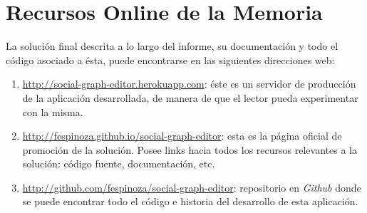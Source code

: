 \section{Recursos Online de la Memoria} %
\label{sec:recursos_online_memoria}

La solución final descrita a lo largo del informe, su documentación y todo el código asociado a ésta, puede encontrarse en las siguientes direcciones web:

  \begin{enumerate}
    \item \url{http://social-graph-editor.herokuapp.com}: éste es un servidor de producción de la aplicación desarrollada, de manera de que el lector pueda experimentar con la misma.
    \item \url{http://fespinoza.github.io/social-graph-editor}: esta es la página oficial de promoción de la solución. Posee links hacia todos los recursos relevantes a la solución: código fuente, documentación, etc.
    \item \url{http://github.com/fespinoza/social-graph-editor}: repositorio en \emph{Github} donde se puede encontrar todo el código e historia del desarrollo de esta aplicación.
  \end{enumerate}

